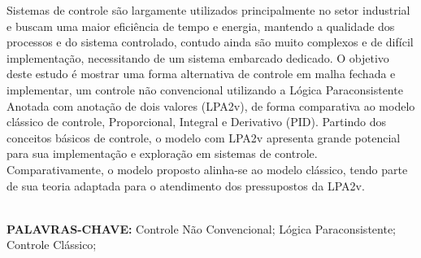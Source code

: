 





Sistemas de controle são largamente utilizados principalmente no setor industrial e buscam uma maior eficiência de tempo e energia, mantendo a qualidade dos processos e do sistema controlado, 
contudo ainda são muito complexos e de difícil implementação, necessitando de um sistema embarcado dedicado.
O objetivo deste estudo é mostrar uma forma alternativa de controle em malha fechada e implementar, um controle não convencional utilizando a Lógica Paraconsistente Anotada com anotação de dois valores (LPA2v), 
de forma comparativa ao modelo clássico de controle, Proporcional, Integral e Derivativo (PID).
Partindo dos conceitos básicos de controle, o modelo com LPA2v apresenta grande potencial para sua implementação e exploração em sistemas de controle.
Comparativamente, o modelo proposto alinha-se ao modelo clássico, tendo parte de sua teoria adaptada para o atendimento dos pressupostos da LPA2v.
		
\noindent
\textbf{\\PALAVRAS-CHAVE:} Controle Não Convencional; Lógica Paraconsistente; Controle Clássico;

